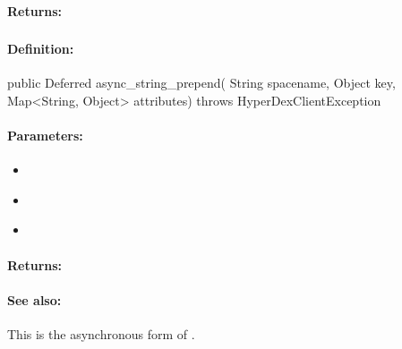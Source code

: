 \paragraph{Returns:}


\pagebreak
\subsubsection{}
\label{api:java:async_string_prepend}


\paragraph{Definition:}
\begin{javacode}
public Deferred async_string_prepend(
        String spacename,
        Object key,
        Map<String, Object> attributes) throws HyperDexClientException
\end{javacode}

\paragraph{Parameters:}
\begin{itemize}[noitemsep]
\item {}\\

\item {}\\

\item {}\\

\end{itemize}

\paragraph{Returns:}


\paragraph{See also:}  This is the asynchronous form of .

